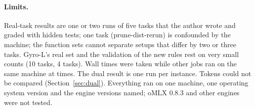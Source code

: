 \paragraph{Limits.} Real-task results are one or two runs of five tasks that the author wrote and graded
with hidden tests; one task (prune-dist-rerun) is confounded by the machine; the function sets cannot separate setups that differ
by two or three tasks. Gyro-L's real set and the validation of the new rules rest on very small counts (10 tasks, 4 tasks).
Wall times were taken while other jobs ran on the same machine at times. The dual result is one run per instance. Tokens
could not be compared (Section~\ref{sec:dual}). Everything ran on one machine, one operating system version and the engine
versions named; oMLX 0.8.3 and other engines were not tested.

\clearpage
{}
{}
\printbibliography[title={References}]


